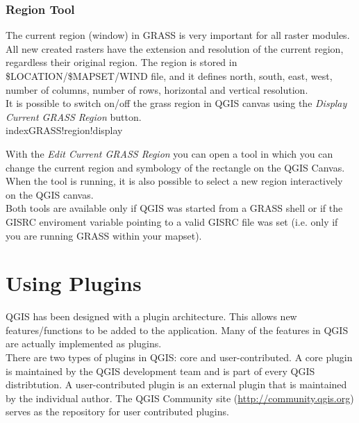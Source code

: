 \documentclass[10pt,english]{article}
\begin{document}
\begin{onehalfspace}
\subsubsection{Region Tool}

The current region (window) in GRASS is very important for all 
raster modules. All new created rasters have the extension and resolution
of the current region, regardless their original region. 
The region is stored in \$LOCATION/\$MAPSET/WIND file, and it defines
north, south, east, west, number of columns, number of rows, 
horizontal and vertical resolution.\\

It is possible to switch on/off the grass region in QGIS canvas
using the \textsl{Display Current GRASS Region}
button.\\index{GRASS!region!display}\

With the \textsl{Edit Current GRASS Region} you can open a tool 
in which you can change the current region and symbology
of the rectangle on the QGIS Canvas. When the tool is running,
it is also possible to select a new region interactively
on the QGIS canvas.\\

Both tools are available only if QGIS was started from a GRASS 
shell or if the GISRC enviroment variable pointing to a
valid GISRC file was set (i.e. only if you are running 
GRASS within your mapset).


\section{Using Plugins}
QGIS has been designed with a plugin architecture. This allows new features/functions to be added to the application. Many of the features in QGIS are actually implemented as plugins.\\

There are two types of plugins in QGIS: core and user-contributed.
A core plugin is maintained by the QGIS development team and is part of every QGIS distribtution. A user-contributed plugin is an external plugin that is maintained by the individual author. The QGIS Community site (\url{http://community.qgis.org}) serves as the repository for user contributed plugins.


\end{onehalfspace}
\end{document}
